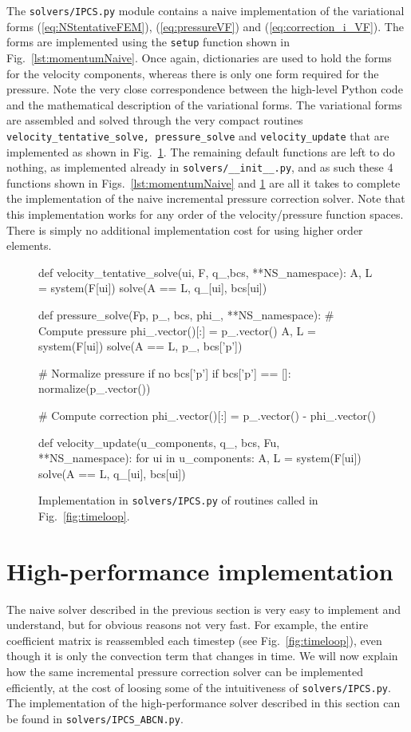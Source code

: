 \documentclass[final,3p,times,twocolumn]{elsarticle}
\newcommand{\inpyth}{\lstinline[style=inlinestyle]} %[]%
\begin{document}
The \inpyth{solvers/IPCS.py} module contains a naive implementation of the variational forms (\ref{eq:NStentativeFEM}), (\ref{eq:pressureVF}) and (\ref{eq:correction_i_VF}). The forms are implemented using the \inpyth{setup} function shown in Fig.~\ref{lst:momentumNaive}. Once again, dictionaries are used to hold the forms for the velocity components, whereas there is only one form required for the pressure. Note the very close correspondence between the high-level Python code and the mathematical description of the variational forms. The variational forms are assembled and solved through the very compact routines \inpyth{velocity_tentative_solve, pressure_solve} and \inpyth{velocity_update} that are implemented as shown in Fig.~\ref{fig:ipcs_solve}. The remaining default functions are left to do nothing, as implemented already in \inpyth{solvers/__init__.py}, and as such these 4 functions shown in Figs.~\ref{lst:momentumNaive} and \ref{fig:ipcs_solve} are all it takes to complete the implementation of the naive incremental pressure correction solver. Note that this implementation works for any order of the velocity/pressure function spaces. There is simply no additional implementation cost for using higher order elements.
\begin{figure}[ht!]
\begin{python}
def velocity_tentative_solve(ui, F, q_,bcs, 
                           **NS_namespace):
  A, L = system(F[ui])
  solve(A == L, q_[ui], bcs[ui])

def pressure_solve(Fp, p_, bcs, phi_, 
                   **NS_namespace):
  # Compute pressure 
  phi_.vector()[:] = p_.vector()
  A, L = system(F[ui])
  solve(A == L, p_, bcs['p'])   

  # Normalize pressure if no bcs['p']  
  if bcs['p'] == []:
    normalize(p_.vector())
    
  # Compute correction
  phi_.vector()[:] = p_.vector() - phi_.vector()

def velocity_update(u_components, q_, bcs, 
                    Fu, **NS_namespace):
  for ui in u_components:
    A, L = system(F[ui])
    solve(A == L, q_[ui], bcs[ui])

\end{python}
\caption{Implementation in \inpyth{solvers/IPCS.py} of routines called in Fig.~\ref{fig:timeloop}.}
\label{fig:ipcs_solve}
\end{figure}

\section{High-performance implementation}
\label{sec:hpc}
The naive solver described in the previous section is very easy to implement and understand, but for obvious reasons not very fast. For example, the entire coefficient matrix is reassembled each timestep (see Fig.~\ref{fig:timeloop}), even though it is only the convection term that changes in time. We will now explain how the same incremental pressure correction solver can be implemented efficiently, at the cost of loosing some of the intuitiveness of \inpyth{solvers/IPCS.py}. The implementation of the high-performance solver described in this section can be found in \inpyth{solvers/IPCS_ABCN.py}. 
\end{document}
